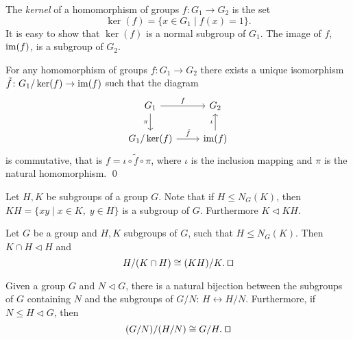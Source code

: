 The {\em kernel} of a homomorphism of groups $f\colon G_1\rightarrow G_2$ is the set
$$\ker (f)=\{ x\in G_1\mid f(x)=1\}.$$
It is easy to show that $\ker(f)$ is a normal subgroup of $G_1$. The image of $f$, $\operatorname{im}(f)$, is a subgroup of $G_2$.

\begin{theorem}
	For any homomorphism of groups $f\colon G_1\rightarrow G_2$ there exists a unique isomorphism $\tilde f\colon G_1/\ker(f)\rightarrow\operatorname{im}(f)$ such that the diagram
	\[\begin{tikzcd}
		{G_1} & {G_2} \\
		{G_1/\ker(f)} & {\im(f)}
		\arrow["f", from=1-1, to=1-2]
		\arrow["{\pi}"', from=1-1, to=2-1]
		\arrow["{\iota}", from=2-2, to=1-2]
		\arrow["{\tilde f}", from=2-1, to=2-2]
	\end{tikzcd}
	\]
	is commutative, that is $f=\iota\circ \tilde f\circ\pi$, where $\iota$ is the inclusion mapping and $\pi$ is the natural homomorphism. \qed	
	\end{theorem} 
 
Let $H,K$ be subgroups of a group $G$. Note that if $H\leq N_G(K)$, then $KH=\{xy\mid x\in K,\; y\in H\}$ is a subgroup of $G$. Furthermore $K\lhd KH$.

\begin{theorem}
	Let $G$ be a group and $H,K$ subgroups of $G$, such that $H\leq N_G(K)$. Then $K\cap H\lhd H$ and
	$$H/(K\cap H)\cong (KH)/K. \; \qed$$  
	\end{theorem}

\begin{theorem} Given a group $G$ and $N\lhd G$, there is a natural bijection between the subgroups of $G$ containing $N$ and the subgroups of $G/N$: $H\leftrightarrow H/N$. Furthermore, if $N\leq H\lhd G$, then
	$$(G/N)/(H/N)\cong G/H.\; \qed$$ 
	\end{theorem}


